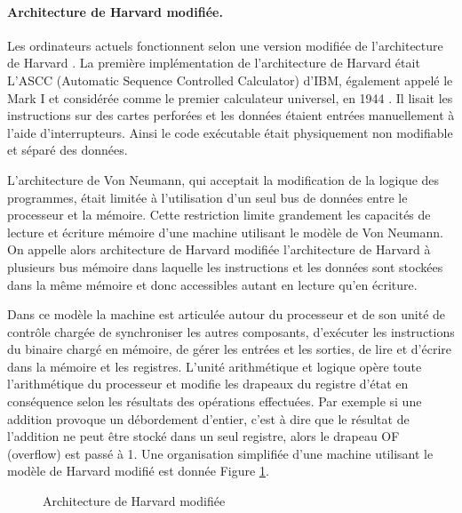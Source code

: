 \paragraph{Architecture de Harvard modifiée.}
Les ordinateurs actuels fonctionnent selon une version modifiée de l'architecture de Harvard \cite{ibm_mark1} .
La première implémentation de l'architecture de Harvard était L’ASCC (Automatic Sequence Controlled Calculator) d'IBM, également appelé le Mark I et considérée comme le premier calculateur universel, en 1944 . 
Il lisait les instructions sur des cartes perforées et les données étaient entrées manuellement à l'aide d'interrupteurs. 
Ainsi le code exécutable était physiquement non modifiable et séparé des données. 


L'architecture de Von Neumann, qui acceptait la modification de la logique des programmes, était limitée à l'utilisation d'un seul bus de données entre le processeur et la mémoire.
Cette restriction limite grandement les capacités de lecture et écriture mémoire d'une machine utilisant le modèle de Von Neumann. On appelle alors architecture de Harvard modifiée l'architecture de Harvard à plusieurs bus mémoire dans laquelle les instructions et les données sont stockées dans la même mémoire et donc accessibles autant en lecture qu'en écriture.

Dans ce modèle la machine est articulée autour du processeur et de son unité de contrôle chargée de synchroniser les autres composants, d'exécuter les instructions du binaire chargé en mémoire, de gérer les entrées et les sorties, de lire et d'écrire dans la mémoire et les registres. L'unité arithmétique et logique opère toute l'arithmétique du processeur et modifie les drapeaux du registre d'état en conséquence selon les résultats des opérations effectuées. Par exemple si une addition provoque un débordement d'entier, c'est à dire que le résultat de l'addition ne peut être stocké dans un seul registre, alors le drapeau OF (overflow) est passé à 1.
Une organisation simplifiée d'une machine utilisant le modèle de Harvard modifié est donnée Figure \ref{fig:arch_harvard_mod}.

\begin{figure}
\begin{center}

\caption{Architecture de Harvard modifiée}
\label{fig:arch_harvard_mod}
\end{center}
\end{figure}

